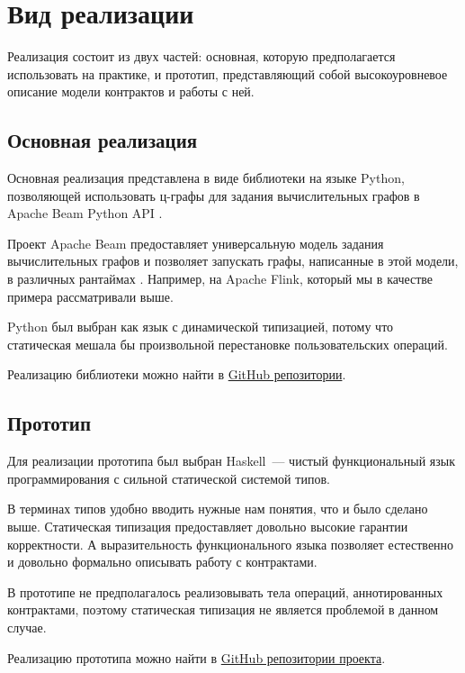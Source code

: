 \section{Вид реализации}

Реализация состоит из двух частей: основная, которую предполагается использовать на практике, и прототип, представляющий собой высокоуровневое описание модели контрактов и работы с ней.

\subsection{Основная реализация}

Основная реализация представлена в виде библиотеки на языке Python, позволяющей использовать ц-графы для задания вычислительных графов в Apache Beam Python API \cite{beam-py}.

Проект Apache Beam предоставляет универсальную модель задания вычислительных графов и позволяет запускать графы, написанные в этой модели, в различных рантаймах \cite{beam}. Например, на Apache Flink, который мы в качестве примера рассматривали выше.

Python был выбран как язык с динамической типизацией, потому что статическая мешала бы произвольной перестановке пользовательских операций.

Реализацию библиотеки можно найти в \href{https://github.com/flame-stream/calco/tree/master/calco}{GitHub репозитории}.

\subsection{Прототип}

Для реализации прототипа был выбран Haskell~--- чистый функциональный язык программирования с сильной статической системой типов.

В терминах типов удобно вводить нужные нам понятия, что и было сделано выше.
Статическая типизация предоставляет довольно высокие гарантии корректности.
А выразительность функционального языка позволяет естественно и довольно формально описывать работу с контрактами.

В прототипе не предполагалось реализовывать тела операций, аннотированных контрактами, поэтому статическая типизация не является проблемой в данном случае.

Реализацию прототипа можно найти в \href{https://github.com/flame-stream/calco/tree/master/calcohs}{GitHub репозитории проекта}.
